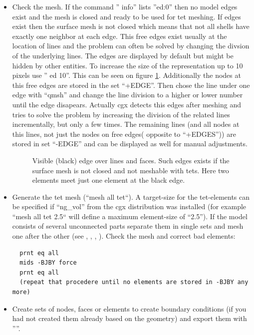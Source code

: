 \documentclass{article}
\begin{document}
\begin{appendix}
\begin{itemize}
\item Check the mesh. If the command '' info'' lists ''ed:0'' then no model edges exist and the mesh is closed and ready to be used for tet meshing. If edges exist then the surface mesh is not closed which means that not all shells have exactly one neighbor at each edge. This free edges exist usually at the location of lines and the problem can often be solved by changing the divsion of the underlying lines. The edges are displayed by default but might be hidden by other entities. To increase the size of the representation up to 10 pixels use '' ed 10''. This can be seen on figure \ref{surfmesh}. Additionally the nodes at this free edges are stored in the set ``+EDGE''. Then chose the line under one edge with ``qmsh'' and change the line division to a higher or lower number until the edge disapears. Actually cgx detects this edges after meshing and tries to solve the problem by increasing the division of the related lines incrementally, but only a few times. The remaining lines (and all nodes at this lines, not just the nodes on free edges( opposite to ``+EDGES'')) are stored in set ``-EDGE'' and can be displayed as well for manual adjustments. 
  
\begin{figure}[h]
\caption{\label{surfmesh}Visible (black) edge over lines and faces. Such edges exists if the surface mesh is not closed and not meshable with tets. Here two elements meet just one element at the black edge. }
\end{figure}

\item Generate the tet mesh (``mesh all tet``). A target-size for the tet-elements can be specified if ``ng\_vol'' from the cgx distribution was installed (for example ``mesh all tet 2.5`` will define a maximum element-size of ``2.5''). If the model consists of several unconnected parts separate them in single sets and mesh one after the other (see , , , ). Check the mesh and correct bad elements:
\begin{verbatim}
  prnt eq all
  mids -BJBY force
  prnt eq all
  (repeat that procedere until no elements are stored in -BJBY any more)
\end{verbatim}

\item Create sets of nodes, faces or elements to create boundary conditions (if you had not created them already based on the geometry) and export them with ''''.


\end{itemize}
\end{appendix}
\end{document}
